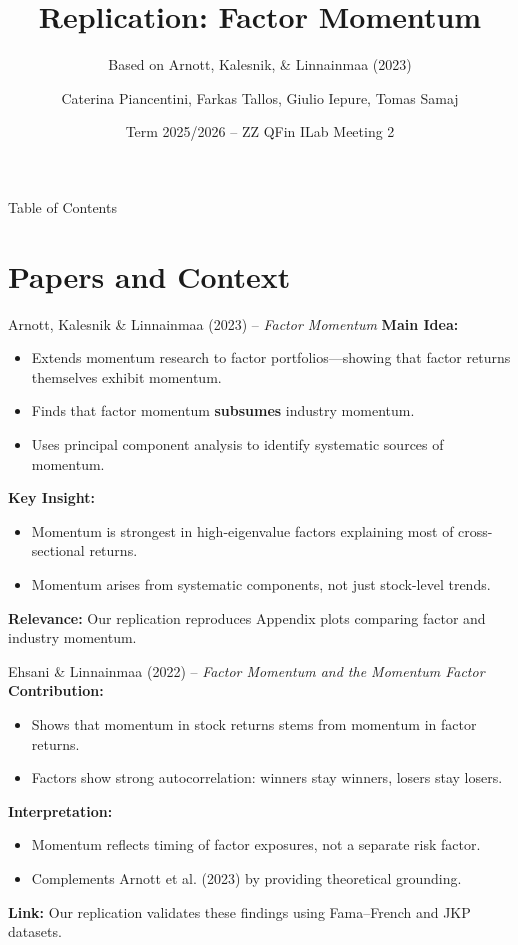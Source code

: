 \documentclass[t]{beamer}
\title{Replication: Factor Momentum}
\subtitle{Based on Arnott, Kalesnik, \& Linnainmaa (2023)}
\author{Caterina Piancentini, Farkas Tallos, Giulio Iepure, Tomas Samaj}
\institute[WU Vienna]{ZZ ILab \\ WU Vienna}
\date{Term 2025/2026 -- ZZ QFin ILab Meeting 2}
\begin{document}
{
\begin{frame}[plain]
    \titlepage
\end{frame}
}

\begin{frame}{Table of Contents}
    \tableofcontents
\end{frame}

\section{Papers and Context}

\begin{frame}{Arnott, Kalesnik \& Linnainmaa (2023) -- \textit{Factor Momentum}}
\textbf{Main Idea:}
\begin{itemize}
    \item Extends momentum research to factor portfolios—showing that factor returns themselves exhibit momentum.
    \item Finds that factor momentum \textbf{subsumes} industry momentum.
    \item Uses principal component analysis to identify systematic sources of momentum.
\end{itemize}

\textbf{Key Insight:}
\begin{itemize}
    \item Momentum is strongest in high-eigenvalue factors explaining most of cross-sectional returns.
    \item Momentum arises from systematic components, not just stock-level trends.
\end{itemize}

\textbf{Relevance:} Our replication reproduces Appendix plots comparing factor and industry momentum.
\end{frame}

\begin{frame}{Ehsani \& Linnainmaa (2022) -- \textit{Factor Momentum and the Momentum Factor}}
\textbf{Contribution:}
\begin{itemize}
    \item Shows that momentum in stock returns stems from momentum in factor returns.
    \item Factors show strong autocorrelation: winners stay winners, losers stay losers.
\end{itemize}

\textbf{Interpretation:}
\begin{itemize}
    \item Momentum reflects timing of factor exposures, not a separate risk factor.
    \item Complements Arnott et al. (2023) by providing theoretical grounding.
\end{itemize}

\textbf{Link:} Our replication validates these findings using Fama–French and JKP datasets.
\end{frame}
\end{document}
